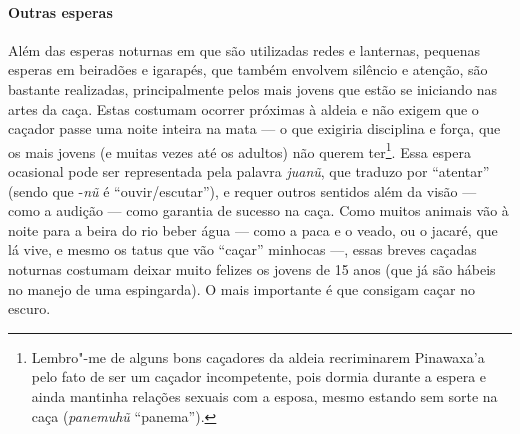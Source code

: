 \paragraph{Outras esperas}

Além das esperas noturnas em que são utilizadas redes e lanternas,
pequenas esperas em beiradões e igarapés, que também envolvem silêncio e
atenção, são bastante realizadas, principalmente pelos mais jovens que
estão se iniciando nas artes da caça. Estas costumam ocorrer próximas à
aldeia e não exigem que o caçador passe uma noite inteira na mata --- o
que exigiria disciplina e força, que os mais jovens (e muitas vezes até
os adultos) não querem ter\footnote{Lembro"-me de alguns bons caçadores
  da aldeia recriminarem Pinawaxa'a pelo fato de ser um caçador
  incompetente, pois dormia durante a espera e ainda mantinha relações
  sexuais com a esposa, mesmo estando sem sorte na caça (\emph{panemuhũ}
  ``panema'').}. Essa espera ocasional pode ser representada pela palavra
\emph{juanũ}, que traduzo por ``atentar'' (sendo que -\emph{nũ} é
``ouvir/escutar''), e requer outros sentidos além da visão --- como a
audição --- como garantia de sucesso na caça. Como muitos animais vão à
noite para a beira do rio beber água --- como a paca e o veado, ou o
jacaré, que lá vive, e mesmo os tatus que vão ``caçar'' minhocas ---, essas
breves caçadas noturnas costumam deixar muito felizes os jovens de 15
anos (que já são hábeis no manejo de uma espingarda). O mais importante
é que consigam caçar no escuro.

